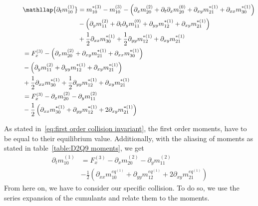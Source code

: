 \begin{align}
  \phantom{\partial_t m_{10}^{(1)}}
  &\begin{aligned}
  \nonumber
    \mathllap{\partial_t m_{10}^{(1)}} & =
    m_{10}^{*(3)} - m_{10}^{(3)}
    - \left(\partial_x m_{20}^{(2)} + \partial_t\partial_x m_{20}^{(0)} + \partial_{xy} m_{21}^{*(1)} + \partial_{xx} m_{30}^{*(1)}\right) \\
    &
    - \left(\partial_y m_{11}^{(2)} + \partial_t\partial_y m_{11}^{(0)} + \partial_{yy} m_{12}^{*(1)} + \partial_{xy} m_{21}^{*(1)}\right) \\
    &
    + \frac{1}{2}\partial_{xx} m_{30}^{*(1)} + \frac{1}{2} \partial_{yy} m_{12}^{*(1)} + \partial_{xy} m_{21}^{*(1)}
  \end{aligned} \\
  &\begin{aligned}
  \nonumber
   & =
    F_x^{(3)}
    - \left(\partial_x m_{20}^{(2)} + \partial_{xy} m_{21}^{*(1)} + \partial_{xx} m_{30}^{*(1)}\right) \\
    &
    - \left(\partial_y m_{11}^{(2)} + \partial_{yy} m_{12}^{*(1)} + \partial_{xy} m_{21}^{*(1)}\right) \\
    &
    + \frac{1}{2}\partial_{xx} m_{30}^{*(1)} + \frac{1}{2} \partial_{yy} m_{12}^{*(1)} + \partial_{xy} m_{21}^{*(1)}
  \end{aligned}\\
%
  &\begin{aligned}
  \nonumber
   & =
    F_x^{(3)}
    - \partial_x m_{20}^{(2)} - \partial_y m_{11}^{(2)}   \\
    &
    - \frac{1}{2} \left(\partial_{xx} m_{30}^{*(1)} + \partial_{yy} m_{12}^{*(1)} + 2\partial_{xy} m_{21}^{*(1)}\right)
  \end{aligned}
\end{align}

As stated in~\eqref{eq:first order collision invariant}, the first order moments, have to be equal to their equilibrium value. Additionally, with the aliasing of moments as stated in table~\ref{table:D2Q9 moments}, we get
\begin{equation}
  \begin{aligned}
  \partial_t m_{10}^{(1)}
   & =
    F_x^{(3)}
    - \partial_x m_{20}^{(2)} - \partial_y m_{11}^{(2)} \\
    &
    - \frac{1}{2} \left(\partial_{xx} m_{10}^{eq^{(1)}} + \partial_{yy} m_{12}^{eq^{(1)}} + 2\partial_{xy} m_{21}^{eq^{(1)}}\right)
  \end{aligned}
\end{equation}
From here on, we have to consider our specific collision. To do so, we use the series expansion of the cumulants and relate them to the moments.
